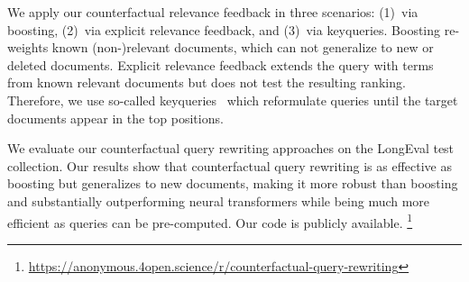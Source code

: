 We apply our counterfactual relevance feedback in three scenarios: (1)~via boosting, (2)~via explicit relevance feedback, and (3)~via keyqueries. Boosting re-weights known (non-)relevant documents, which can not generalize to new or deleted documents. Explicit relevance feedback extends the query with terms from known relevant documents but does not test the resulting ranking. Therefore, we use so-called keyqueries~\cite{gollub:2013a} which reformulate queries until the target documents appear in the top positions.

We evaluate our counterfactual query rewriting approaches on the LongEval test collection. Our results show that counterfactual query rewriting is as effective as boosting but generalizes to new documents,  making it more robust than boosting and substantially outperforming neural transformers while being much more efficient as queries can be pre-computed. Our code is publicly available.%
\footnote{\url{https://anonymous.4open.science/r/counterfactual-query-rewriting}}

